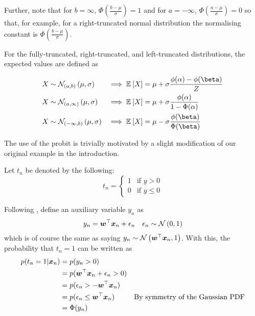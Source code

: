 Further, note that for $b = \infty$, $\Phi(\frac{b-\mu}{\sigma}) = 1$ and for $a = -\infty$, $\Phi(\frac{a-\mu}{\sigma}) = 0$ so that, for example, for a right-truncated normal distribution the normalising constant is $\Phi(\frac{b - \mu}{\sigma})$.

For the fully-truncated, right-truncated, and left-truncated distributions, the expected values are defined as

\begin{align}
X & \sim \mathcal{N}_{(a,b)}\left(\mu, \sigma \right) & \implies \ex{X}{} & = \mu + \sigma \frac{\phi(\alpha) - \phi(\beta)}{Z} \label{eqn:full-trunc-mean} \\ 
X & \sim \mathcal{N}_{(a,\infty)}\left(\mu, \sigma \right) & \implies \ex{X}{} & = \mu + \sigma \frac{\phi(\alpha)}{1 - \Phi(\alpha)} \label{eqn:left-trunc-mean} \\
X & \sim \mathcal{N}_{(-\infty,b)}\left(\mu, \sigma \right) & \implies \ex{X}{} & = \mu - \sigma\frac{\phi(\beta)}{\Phi(\beta)} \label{eqn:right-trunc-mean}
\end{align}


The use of the probit is trivially motivated by a slight modification of our original example in the introduction.

Let $t_n$ be denoted by the following:
\begin{equation}
    t_n = \left\{ \begin{matrix}
        1 & \text{if } y > 0 \\
        0 & \text{if } y \leq 0
    \end{matrix} \right.
\end{equation}


Following \cite{AlbertChib1994}, define an auxiliary variable $y_n$ as
\begin{align}
y_n & = \bm w^\top \bm x_n + \epsilon_n & \epsilon_n \sim \mathcal{N} \left( {0}, {1} \right)
\end{align}
which is of course the same as saying $y_n \sim \mathcal{N} \left( {\bm w^\top\bm x_n}, {1} \right)$. With this, the probability that $t_n = 1$ can be written as
\begin{align}
p(t_n = 1 | \bm x_n) & = p (y_n > 0) \\
& = p(\bm w^\top\bm x_n + \epsilon_n > 0) \\
& = p(\epsilon_n > - \bm w^\top\bm x_n) \\
& = p(\epsilon_n \leq \bm w^\top\bm x_n) & \text{By symmetry of the Gaussian PDF} \\
& = \Phi(y_n)
\end{align}

